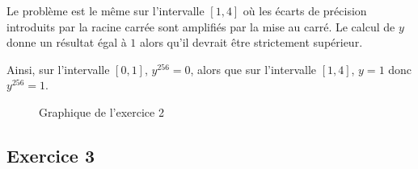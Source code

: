 \documentclass[a4paper,11pt]{article}
\theoremstyle{nonumberplain}
\theoremstyle{nonumberplain}
\theoremstyle{nonumberplain}
\begin{document}
    Le problème est le même sur l'intervalle $[1, 4]$ où les écarts de précision introduits par la racine carrée sont amplifiés par la mise au carré. Le calcul de $y$ donne
    un résultat égal à $1$ alors qu'il devrait être strictement supérieur.

    Ainsi, sur l'intervalle $[0, 1]$, $y^{256} = 0$, alors que sur l'intervalle $[1, 4]$, $y = 1$ donc $y^{256} = 1$.

    \begin{figure}
        \centering
        \caption{\label{graph_exo2} Graphique de l'exercice 2}
    \end{figure}


\subsection*{Exercice 3}
\end{document}
